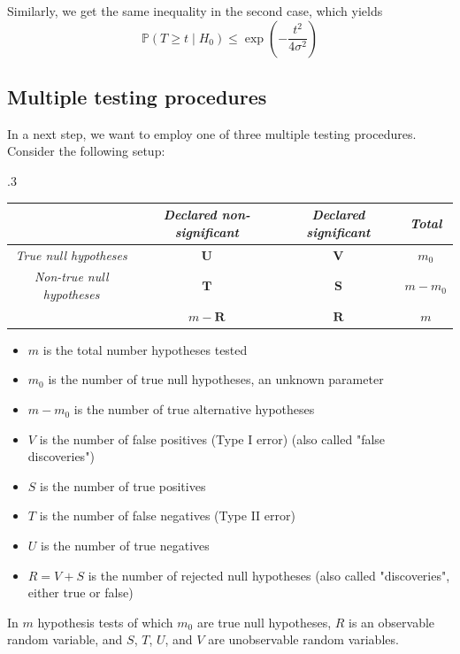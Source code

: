 \documentclass[a4paper,12pt]{article}
\theoremstyle{plain}
\theoremstyle{definition}
\theoremstyle{remark}
\begin{document}
Similarly, we get the same inequality in the second case, which yields
\begin{equation}
	\mathbb{P}(T \geq t \mid H_0) \leq \exp \left( - \frac{t^2}{4 \sigma^2} \right)
\end{equation}

\newpage

\subsection{Multiple testing procedures}

In a next step, we want to employ one of three multiple testing procedures. Consider the following setup:
\begin{table}[h]
	\tymax .3\textwidth
	\begin{tabulary}{\textwidth}{|CCCC|}
		\hline
		& \textit{Declared non-significant} & \textit{Declared significant} & \textit{Total} \\
		\hline
		\textit{True null hypotheses} & $\mathbf{U}$ & $\mathbf{V}$ & $m_0$ \\
		\textit{Non-true null hypotheses} & $\mathbf{T}$ & $\mathbf{S}$ & $m - m_0$ \\
		& $m - \mathbf{R}$ & $\mathbf{R}$ & $m$ \\
		\hline
	\end{tabulary}
\end{table}

\begin{itemize}
	\item $m$ is the total number hypotheses tested
	\item $m_0$ is the number of true null hypotheses, an unknown parameter
	\item $m - m_0$ is the number of true alternative hypotheses
	\item $V$ is the number of false positives (Type I error) (also called "false discoveries")
	\item $S$ is the number of true positives
	\item $T$ is the number of false negatives (Type II error)
	\item $U$ is the number of true negatives
	\item $R = V + S$ is the number of rejected null hypotheses (also called "discoveries", either true or false)
\end{itemize}
In $m$ hypothesis tests of which $m_0$ are true null hypotheses, $R$ is an observable random variable, and $S$, $T$, $U$, and $V$ are unobservable random variables.
\end{document}
